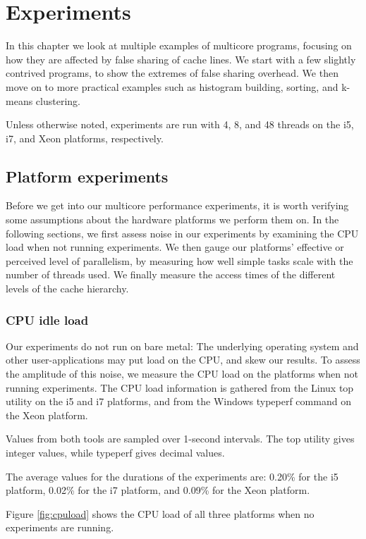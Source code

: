 \chapter{Experiments}
\label{chap:experiments}

In this chapter we look at multiple examples of multicore programs, focusing on
how they are affected by false sharing of cache lines. We start with a few
slightly contrived programs, to show the extremes of false sharing overhead. We
then move on to more practical examples such as histogram building, sorting,
and k-means clustering.

Unless otherwise noted, experiments are run with 4, 8, and 48 threads on the i5,
i7, and Xeon platforms, respectively.

\section{Platform experiments}
Before we get into our multicore performance experiments, it is worth verifying
some assumptions about the hardware platforms we perform them on. In the
following sections, we first assess noise in our experiments by examining the CPU
load when not running experiments. We then gauge our platforms' effective or
perceived level of parallelism, by measuring how well simple tasks scale with the
number of threads used. We finally measure the access times of the different
levels of the cache hierarchy.

\subsection{CPU idle load}
Our experiments do not run on bare metal: The underlying operating system and
other user-applications may put load on the CPU, and skew our results.
To assess the amplitude of this noise, we measure the CPU load on the platforms
when not running experiments.
The CPU load information is gathered from the Linux top utility on the
i5 and i7 platforms, and from the Windows typeperf command on the Xeon
platform.

Values from both tools are sampled over 1-second intervals. The top
utility gives integer values, while typeperf gives decimal values.

The average values for the durations of the experiments are: 0.20\% for the i5
platform, 0.02\% for the i7 platform, and 0.09\% for the Xeon platform.

Figure \ref{fig:cpuload} shows the CPU load of all three platforms when no
experiments are running.

